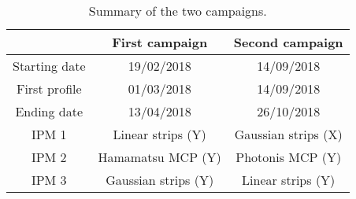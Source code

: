 \begin{table}[!h]
  \centering
  \begin{tabular}{ccc}
    \toprule
                  & First campaign      & Second campaign     \\
    \midrule
    Starting date & 19/02/2018          & 14/09/2018          \\
    First profile & 01/03/2018          & 14/09/2018          \\
    Ending date   & 13/04/2018          & 26/10/2018          \\
    IPM 1         & Linear strips (Y)   & Gaussian strips (X) \\
    IPM 2         & Hamamatsu MCP (Y)   & Photonis MCP (Y)    \\
    IPM 3         & Gaussian strips (Y) & Linear strips (Y)   \\
    \bottomrule
  \end{tabular}
  \caption[Summary of the two campaigns]{Summary of the two campaigns.}
  \label{chap4:IPHI_campaign}
\end{table}